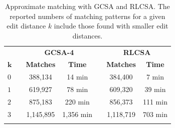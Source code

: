 \begin{table}[t!]
\centering
\renewcommand{\tabcolsep}{1mm}
{\begin{tabular}{lcccccc}%
\hline\noalign{\smallskip}
 & & \multicolumn{2}{c}{{\bf GCSA-4}} & & \multicolumn{2}{c}{{\bf RLCSA}}  \\%
$\mathbf{k}$ & & {\bf Matches} & {\bf Time} & & {\bf Matches} & {\bf Time} \\%
\noalign{\smallskip}
\hline
\noalign{\smallskip}
$0$ & &   388,134 &    14 min & &   384,400 &   7 min  \\%
$1$ & &   619,927 &    78 min & &   609,320 &  39 min  \\%
$2$ & &   875,183 &   220 min & &   856,373 & 111 min  \\%
$3$ & & 1,145,895 & 1,356 min & & 1,118,719 & 703 min  \\%
\noalign{\smallskip}
\hline
\end{tabular}}

\caption{Approximate matching with GCSA and RLCSA. The reported numbers of matching patterns for a given edit distance $k$ include those found with smaller edit distances.}
\label{table:gcsa comparison}
\end{table}
